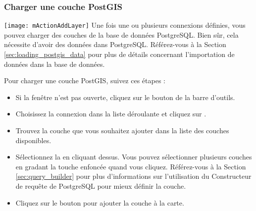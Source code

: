 \subsubsection{Charger une couche PostGIS}

\texttt{[image: mActionAddLayer]} Une fois une ou plusieurs connexions d\'efinies, vous pouvez charger des couches de la base de donn\'ees PostgreSQL. Bien s\^ur, cela n\'ecessite d'avoir des donn\'ees dans PostgreSQL. R\'ef\'erez-vous \`a la Section \ref{sec:loading_postgis_data} pour plus de d\'etails concernant l'importation de donn\'ees dans la base de donn\'ees.

Pour charger une couche PostGIS, suivez ces \'etapes :

\begin{itemize}
\item Si la fen\^etre  n'est pas ouverte, cliquez sur le bouton  de la barre d'outils.
\item Choisissez la connexion dans la liste d\'eroulante et cliquez sur .
\item Trouvez la couche que vous souhaitez ajouter dans la liste des couches disponibles.
\item S\'electionnez la en cliquant dessus. Vous pouvez s\'electionner plusieurs couches en gradant la touche  enfonc\'ee quand vous cliquez. R\'ef\'erez-vous \`a la Section \ref{sec:query_builder} pour plus d'informations sur l'utilisation du Constructeur de requ\^ete de PostgreSQL pour mieux d\'efinir la couche.
\item Cliquez sur le bouton  pour ajouter la couche \`a la carte.
\end{itemize}

